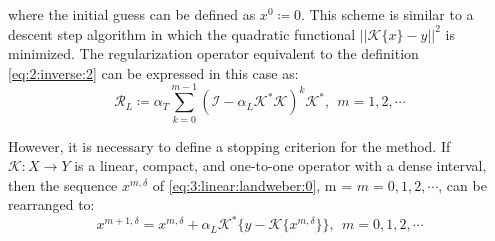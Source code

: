 			\noindent where the initial guess can be defined as $x^0\coloneqq 0$. This scheme is similar to a descent step algorithm in which the quadratic functional $||\mathcal{K}\{x\}-y||^2$ is minimized. The regularization operator equivalent to the definition \eqref{eq:2:inverse:2} can be expressed in this case as:
			\begin{equation}
				\mathcal{R}_L \coloneqq \alpha_T \sum\limits_{k=0}^{m-1} (\mathcal{I}-\alpha_L\mathcal{K}^*\mathcal{K})^k\mathcal{K}^*,~~ m=1,2,\cdots \label{eq:3:linear:landweber:operator}
			\end{equation}
			
			However, it is necessary to define a stopping criterion for the method. If $\mathcal{K}:X\rightarrow Y$ is a linear, compact, and one-to-one operator with a dense interval, then the sequence $x^{m,\delta}$ of \eqref{eq:3:linear:landweber:0}, m = $m=0,1,2,\cdots$, can be rearranged to:
			\begin{equation}
				x^{m+1,\delta} = x^{m,\delta} + \alpha_L\mathcal{K}^*\{y-\mathcal{K}\{x^{m,\delta}\}\},~~m=0,1,2,\cdots \label{eq:3:linear:landweber:1}
			\end{equation}
		
